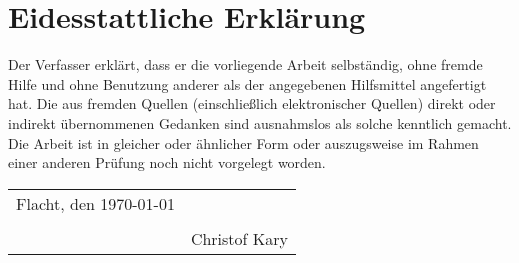 \chapter*{Eidesstattliche Erklärung}
\thispagestyle{empty}

Der Verfasser erklärt, dass er die vorliegende Arbeit selbständig, ohne fremde Hilfe und ohne Benutzung anderer als der angegebenen Hilfsmittel angefertigt hat. Die aus fremden Quellen (einschließlich elektronischer Quellen) direkt oder indirekt übernommenen Gedanken sind ausnahmslos als solche kenntlich gemacht. Die Arbeit ist in gleicher oder ähnlicher Form oder auszugsweise im Rahmen einer anderen Prüfung noch nicht vorgelegt worden.\\

\vspace{10mm}
	
	\begin{center}
		
		\begin{tabular}{l l}
			Flacht, den \today \hspace{20mm} & \hspace{60mm} \\ \cline{2-2} 
			                                 & \\
			                                 & Christof Kary
		\end{tabular}
	\end{center}

\vspace{10mm}


